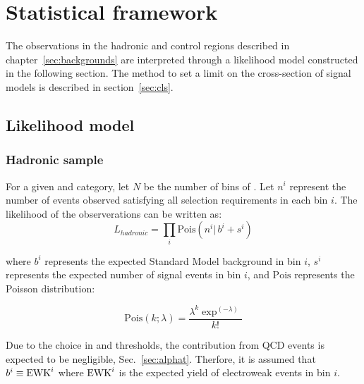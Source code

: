 \clearpage
\section{Statistical framework}
\label{sec:statistics}
The observations in the hadronic and control regions described in 
chapter~\ref{sec:backgrounds} are interpreted through a likelihood model 
constructed in the following section. The method to set a limit on the 
cross-section of signal models is described in section~\ref{sec:cls}. 

\subsection{Likelihood model\label{likelihood}}

\subsubsection{Hadronic sample}
\label{sec:hadronicLikelihood}

For a given \njet and \nb category, 
let $N$ be the number of bins of \HT. Let $n^i$ represent 
the number of events observed satisfying all selection requirements 
in each \HT bin $i$.  The likelihood of the observerations can be written
as:
\begin{equation}
L_{hadronic}=\prod_i \mathrm{Pois}(n^i |\, b^i + s^i)
\label{eq:hadronicLikelihood}
\end{equation}

where $b^i$ represents the expected Standard Model background in bin
$i$, $s^i$ represents the expected number of signal events in bin $i$,
and $\mathrm{Pois}$ represents the Poisson distribution:

\begin{equation}
\mathrm{Pois}\left(k;\lambda\right)= \frac{\lambda^k \exp^{\left(-\lambda\right)}}{k!}
\label{eq:poisson}
\end{equation}

Due to the choice in \alphat and \scalht thresholds, the contribution 
from QCD events is expected to be negligible, Sec.~\ref{sec:alphat}. Therfore,
it is assumed that $b^i\equiv \mathrm{EWK}^i$ where $\mathrm{EWK}^i$ is the expected 
yield of electroweak events in bin $i$.



